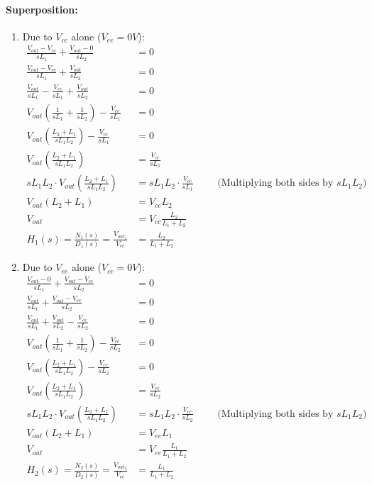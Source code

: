 \paragraph{Superposition:}
\begin{enumerate}
  \item Due to \(V_{cc}\) alone (\(V_{ee} = 0V\)):
    \begin{align*}
      \frac{V_{out} - V_{cc}}{sL_1} + \frac{V_{out} - 0}{sL_2} &= 0 \\
      \frac{V_{out} - V_{cc}}{sL_1} + \frac{V_{out}}{sL_2} &= 0 \\
      \frac{V_{out}}{sL_1} - \frac{V_{cc}}{sL_1} + \frac{V_{out}}{sL_2} &= 0 \\
      V_{out}\left(\frac{1}{sL_1} + \frac{1}{sL_2}\right) - \frac{V_{cc}}{sL_1} &= 0 \\
      V_{out}\left(\frac{L_2 + L_1}{sL_1 L_2}\right) - \frac{V_{cc}}{sL_1} &= 0 \\
      V_{out}\left(\frac{L_2 + L_1}{sL_1 L_2}\right) &= \frac{V_{cc}}{sL_1} \\
      sL_1 L_2 \cdot V_{out}\left(\frac{L_2 + L_1}{sL_1 L_2}\right) &= sL_1 L_2 \cdot \frac{V_{cc}}{sL_1} \hspace{1cm} \text{(Multiplying both sides by \(sL_1 L_2\))} \\
      V_{out}(L_2 + L_1) &= V_{cc} L_2 \\
      V_{out} &= V_{cc} \frac{L_2}{L_1 + L_2} \\
      H_1(s) = \frac{N_1(s)}{D_1(s)} = \frac{V_{out_1}}{V_{cc}} &= \frac{L_2}{L_1 + L_2}
    \end{align*}
  \item Due to \(V_{ee}\) alone (\(V_{cc} = 0V\)):
    \begin{align*}
      \frac{V_{out} - 0}{sL_1} + \frac{V_{out} - V_{ee}}{sL_2} &= 0 \\
      \frac{V_{out}}{sL_1} + \frac{V_{out} - V_{ee}}{sL_2} &= 0 \\
      \frac{V_{out}}{sL_1} + \frac{V_{out}}{sL_2} - \frac{V_{ee}}{sL_2} &= 0 \\
      V_{out}\left(\frac{1}{sL_1} + \frac{1}{sL_2}\right) - \frac{V_{ee}}{sL_2} &= 0 \\
      V_{out}\left(\frac{L_2 + L_1}{sL_1 L_2}\right) - \frac{V_{ee}}{sL_2} &= 0 \\
      V_{out}\left(\frac{L_2 + L_1}{sL_1 L_2}\right) &= \frac{V_{ee}}{sL_2} \\
      sL_1 L_2 \cdot V_{out}\left(\frac{L_2 + L_1}{sL_1 L_2}\right) &= sL_1 L_2 \cdot \frac{V_{ee}}{sL_2} \hspace{1cm} \text{(Multiplying both sides by \(sL_1 L_2\))} \\
      V_{out}(L_2 + L_1) &= V_{ee} L_1 \\
      V_{out} &= V_{ee} \frac{L_1}{L_1 + L_2} \\
      H_2(s) = \frac{N_2(s)}{D_2(s)} = \frac{V_{out_2}}{V_{ee}} &= \frac{L_1}{L_1 + L_2}
    \end{align*}
\end{enumerate}

